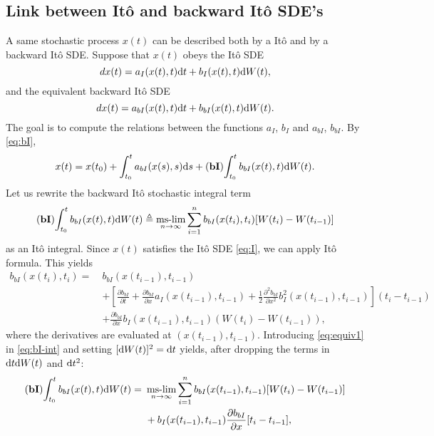 \subsection{Link between Itô and backward Itô SDE's}
A same stochastic process $x(t)$ can be described both by a Itô and by a backward Itô SDE. Suppose that $x(t)$ obeys the Itô SDE
\begin{equation} \label{eq:I}
	dx(t) = a_I(x(t),t) \rm dt + b_I(x(t),t) \rm dW(t),
\end{equation}
and the equivalent backward Itô SDE
\begin{equation} \label{eq:bI}
	dx(t) = a_{bI}(x(t),t) \rm dt + b_{bI}(x(t),t) \rm dW(t). 
\end{equation}
The goal is to compute the relations between the functions $a_I$, $b_I$ and $a_{bI}$, $b_{bI}$. By \eqref{eq:bI},
\begin{equation}
	x(t) = x(t_0) + \int_{t_0}^t a_{bI}(x(s),s) \rm ds + \bI \int_{t_0}^t b_{bI}(x(t),t) \rm dW(t).
\end{equation}
Let us rewrite the backward Itô stochastic integral term
\begin{equation} \label{eq:bI-int}
	\bI \int_{t_0}^t b_{bI}(x(t),t) \rm dW(t) \triangleq \mslim_{n\rightarrow \infty} \sum_{i=1}^n b_{bI}(x(t_{i}),t_{i}) [W(t_i)-W(t_{i-1})]
\end{equation}
as an Itô integral. Since $x(t)$ satisfies the Itô SDE \eqref{eq:I}, we can apply Itô formula. This yields 
\begin{align} \label{eq:equiv1}
	b_{bI}(x(t_i),t_{i}) =~& b_{bI}(x(t_{i-1}),t_{i-1}) \nonumber\\
		&+ \left[\frac{\partial b_{bI}}{\partial t} + \frac{\partial b_{bI}}{\partial x} a_I(x(t_{i-1}),t_{i-1}) + \frac{1}{2}\frac{\partial^2 b_{bI}}{\partial x^2} b_I^2(x(t_{i-1}),t_{i-1})\right] (t_i - t_{i-1}) \nonumber\\
		&+ \frac{\partial b_{bI}}{\partial x}b_I(x(t_{i-1}),t_{i-1}) (W(t_i) - W(t_{i-1})),
\end{align}
where the derivatives are evaluated at $(x(t_{i-1}),t_{i-1})$. Introducing \eqref{eq:equiv1} in \eqref{eq:bI-int} and setting $[\rm dW(t)]^2 = \rm dt$ yields, after dropping the terms in $\rm dt \rm dW(t)$ and $\rm dt^2$:
\begin{align}
	\bI \int_{t_0}^t b_{bI}(x(t),t) \rm dW(t) =~& \mslim_{n\rightarrow \infty} \sum_{i=1}^n b_{bI}(x(t_{i-1}),t_{i-1}) [W(t_i)-W(t_{i-1})] \nonumber\\
	&+ b_I(x(t_{i-1}),t_{i-1}) \frac{\partial b_{bI}}{\partial x}[t_i - t_{i-1}],
\end{align}

